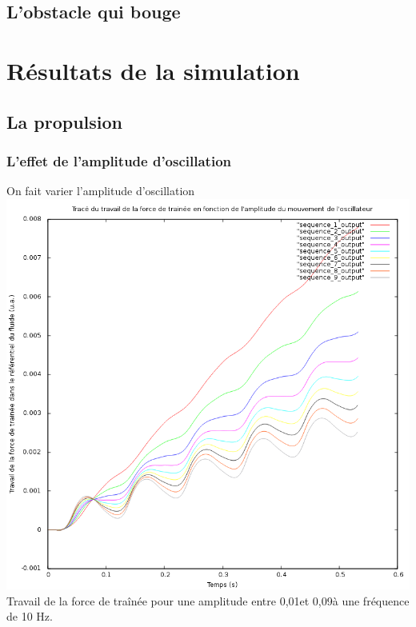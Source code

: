 \documentclass{beamer}
\begin{document}
  \subsection{L'obstacle qui bouge}
  
\section{Résultats de la simulation}
 
 \subsection{La propulsion}
 		
 	\begin{frame}
 		\frametitle{L'effet de l'amplitude d'oscillation}
 			On fait varier l'amplitude d'oscillation
 			\centering \includegraphics[height= 0.6 \textheight]{9courbes.png}\\
 			Travail de la force de traînée pour une amplitude entre 0,01\degre et 0,09\degre à une fréquence de 10 Hz.
 	\end{frame}
 	
\end{document}
